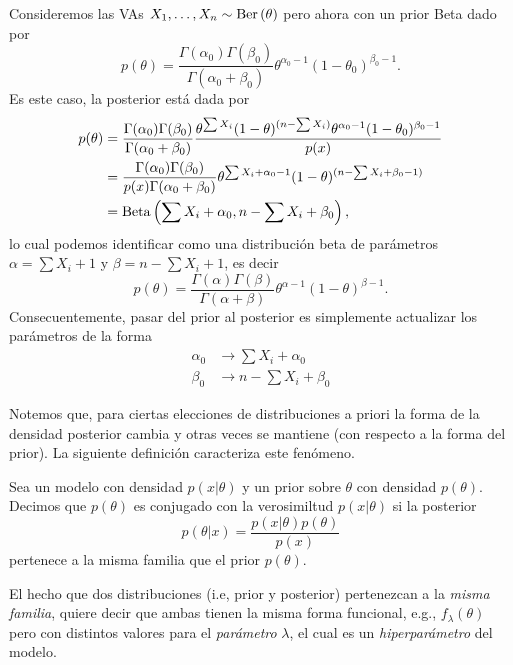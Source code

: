 \begin{example}
	Consideremos las VAs $X_1,\ldots,X_n \sim\text{Ber}\left(\theta\right)$ pero ahora con un prior Beta dado por 
	\begin{equation}
		p(\theta) = \frac{\Gamma{(\alpha_0)}\Gamma{(\beta_0)}}{\Gamma{(\alpha_0 + \beta_0)}} \theta^{\alpha_0 - 1}(1-\theta_0)^{\beta_0 - 1}.
	\end{equation}
	Es este caso, la posterior está dada por 
	\begin{align}
	 	p(\theta) &= \frac{\Gamma{(\alpha_0)}\Gamma{(\beta_0)}}{\Gamma{(\alpha_0 + \beta_0)}} \frac{\theta^{\sum X_i}(1-\theta)^{(n-\sum X_i)} \theta^{\alpha_0 - 1}(1-\theta_0)^{\beta_0 - 1}}{p(x)} \\
	 	&= \frac{\Gamma{(\alpha_0)}\Gamma{(\beta_0)}}{p(x) \Gamma{(\alpha_0 + \beta_0)}} \theta^{\sum X_i + \alpha_0 - 1 }(1-\theta)^{(n-\sum X_i + \beta_0-1)} \\
	 	&= \text{Beta}\left(\sum X_i + \alpha_0, n-\sum X_i + \beta_0\right),
	 \end{align} 
	 lo cual podemos identificar como una distribución beta de parámetros $\alpha = \sum X_i + 1$ y $\beta = n-\sum X_i +1 $, es decir 
	 \begin{equation}
	 	p(\theta) = \frac{\Gamma{(\alpha)}\Gamma{(\beta)}}{\Gamma{(\alpha + \beta)}} \theta^{\alpha - 1}(1-\theta)^{\beta - 1}.
	 \end{equation}  
	 Consecuentemente, pasar del prior al posterior es simplemente actualizar los parámetros de la forma 
	 \begin{align}
	 	\alpha_0 &\to \sum X_i + \alpha_0\\
	 	\beta_0 &\to n-\sum X_i + \beta_0
	 \end{align}

\end{example}

Notemos que, para ciertas elecciones de distribuciones a priori la forma de la densidad posterior cambia y otras veces se mantiene (con respecto a la forma del prior). La siguiente definición caracteriza este fenómeno.

\begin{definition} Sea un modelo con densidad $p(x|\theta)$ y un prior sobre $\theta$ con densidad $p(\theta)$. Decimos que $p(\theta)$ es conjugado con la verosimiltud $p(x|\theta)$ si la posterior 
\begin{equation}
	p(\theta|x) = \frac{p(x|\theta)p(\theta)}{p(x)}
\end{equation}
pertenece a la misma familia que el prior $p(\theta)$.
\end{definition}
El hecho que dos  distribuciones (i.e, prior y posterior) pertenezcan a la \textit{misma familia}, quiere decir que ambas tienen la misma forma funcional, e.g., $f_\lambda(\theta)$ pero con distintos valores para el \textit{parámetro} $\lambda$, el cual es un \textit{hiperparámetro} del modelo. 

